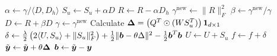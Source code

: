 \begin{algorithm}
\begin{algorithmic}[1]
            \State $\alpha \gets \gamma / \langle D,D_h \rangle$
            \State $S_u \gets S_u+\alpha D$
            \State $R \gets R-\alpha D_h$
            \State $\gamma^{\text{new}} \gets \|R\|_F^2$
            \State $\beta \gets \gamma^{\text{new}}/\gamma$
            \State $D \gets R+\beta D$
            \State $\gamma \gets \gamma^{\text{new}}$
        \EndWhile
            \State Calculate $\boldsymbol{\Delta} = \left( Q^T \odot (WS_u^T) \right)\boldsymbol{1}_{d\times 1}$ %
            \State $\delta \gets \frac{\lambda}{2} \left( 2 \langle U, S_u \rangle + \|S_u\|_F^2 \right) + \frac{1}{2} \|\boldsymbol{b}-\theta \Delta \|^2
                - \frac{1}{2}\boldsymbol{b}^T \boldsymbol{b}$
            \State $U \gets U + S_u$
            \State $f \gets f + \delta$
            \State $\tilde{\boldsymbol{y}} \gets \tilde{\boldsymbol{y}} + \theta \boldsymbol{\Delta}$
            \State $\boldsymbol{b} \gets \tilde{\boldsymbol{y}} - \boldsymbol{y}$

        \EndFor
    \end{algorithmic}
\end{algorithm}